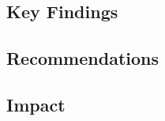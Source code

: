 \documentclass[11pt]{article}
\begin{document}
\subsection{Key Findings}


\subsection{Recommendations}


\subsection{Impact}

\end{document}
